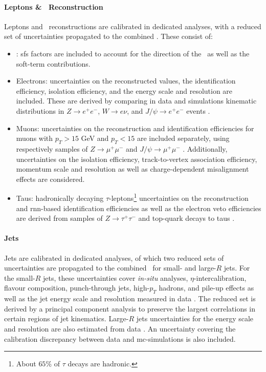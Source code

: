 \paragraph{Leptons \& \etm\ Reconstruction} Leptons and \etm\ reconstructions are calibrated in dedicated analyses, with a reduced set of uncertainties propagated to the combined \vhbc. These consist of:
\begin{itemize}
    \item \etm: \glspl{sf} factors are included to account for the direction of the \etm\ as well as the soft-term contributions. %
    \item Electrons: uncertainties on the reconstructed values, the identification efficiency, isolation efficiency, and the energy scale and resolution are included. These are derived by comparing in data and simulations kinematic distributions in $Z \rightarrow e^+ e^-$, $W\rightarrow e\nu$, and $J/\psi \rightarrow e^+e^-$ events \Cite{Aaboud:2657964}. 
    \item Muons: uncertainties on the reconstruction and identification efficiencies for muons with $p_T > 15$ GeV and $p_T < 15$ are included separately, using respectively samples of $Z\rightarrow \mu^+\mu^-$ and $J/\psi \rightarrow \mu^+\mu^-$ \cite{Aad:2746302}. Additionally, uncertainties on the isolation efficiency, track-to-vertex association efficiency, momentum scale and resolution as well as charge-dependent misalignment effects are considered. 
    \item Taus: hadronically decaying $\tau$-leptons\footnote{About $65$\% of $\tau$ decays are hadronic.} uncertainties on the reconstruction and \gls{rnn}-based identification efficiencies as well as the electron veto efficiencies are derived from samples of $Z\rightarrow\tau^+ \tau^-$ and top-quark decays to taus \cite{ATL-PHYS-PUB-2019-033, ATL-PHYS-PUB-2015-045, ATLAS-CONF-2017-029}.
\end{itemize}

\paragraph{Jets} Jets are calibrated in dedicated analyses, of which two reduced sets of uncertainties are propagated to the combined \vhbc\ for small- and large-$R$ jets. For the small-$R$ jets, these uncertainties cover \textit{in-situ} analyses, $\eta$-intercalibration, flavour composition, punch-through jets, high-$p_T$ hadrons, and pile-up effects as well as the jet energy scale and resolution measured in data \cite{ATLASjesjerMeas, Aad:2854733}. The reduced set is derived by a principal component analysis to preserve the largest correlations in certain regions of jet kinematics. Large-$R$ jets uncertainties for the energy scale and resolution are also estimated from data \cite{ATLAS:2018bip}. An uncertainty covering the calibration discrepancy between data and \gls{mc}-simulations is also included.

